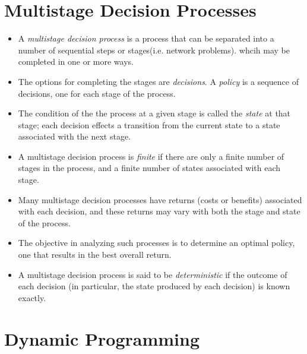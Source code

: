 \documentclass[]{article}
\begin{document}
\section*{Multistage Decision Processes}
\begin{itemize}
	\item A \textit{multistage decision process }is a process that can be separated into a number of sequential steps or stages(i.e. network problems).
	whcih may be completed in one or more ways.
	
	\item The options for completing the stages are \textit{decisions}. A \textit{policy} is a sequence of decisions, one for each stage of the process.
	
	\item The condition of the the process at a given stage is called the \textit{state} at that stage; each decision effects a transition from the current state to a state associated with 
	the next stage.
	
	\item A multistage decision process is \textit{finite} if there are only a finite number of stages in the process, and a finite number of states associated
	with each stage.
	
	\item Many multistage decision processes have returns (costs or benefits) associated with each decision, 
	and these returns may vary with both the stage and state of the process.
	
	\item The objective in analyzing such processes is to determine an optimal policy, one that results in the best overall return.
	
	\item A multistage decision process is said to be \textit{deterministic} if the outcome of each decision (in particular, the state produced by each decision) is known exactly.
\end{itemize}




\section*{Dynamic Programming}
\end{document}
